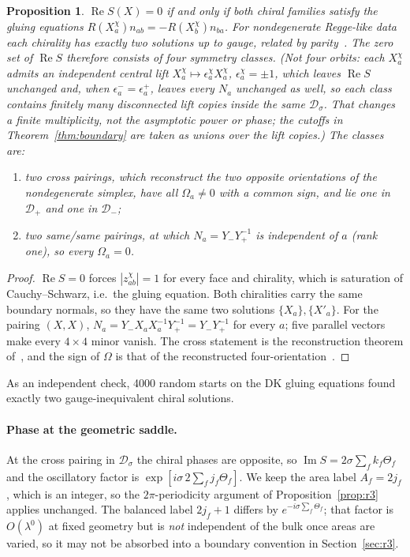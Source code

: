 \documentclass[11pt]{article}
\numberwithin{equation}{section}
\newtheorem{proposition}[theorem]{Proposition}
\theoremstyle{definition}
\theoremstyle{remark}
\newcommand{\Dom}{\mathcal D}
\renewcommand{\Re}{\operatorname{Re}}
\renewcommand{\Im}{\operatorname{Im}}
\begin{document}
\begin{proposition}\label{prop:crit}
$\Re S(X)=0$ if and only if both chiral families satisfy the gluing equations
$R(X_a^\chi)n_{ab}=-R(X_b^\chi)n_{ba}$. For nondegenerate Regge-like data each
chirality has exactly two solutions up to gauge, related by
parity~\cite{BarrettEtAl2009}. The zero set of $\Re S$ therefore consists of four symmetry classes. (Not four
orbits: each $X_a^\chi$ admits an independent central lift
$X_a^\chi\mapsto\epsilon_a^\chi X_a^\chi$, $\epsilon_a^\chi=\pm1$, which leaves
$\Re S$ unchanged and, when $\epsilon_a^-=\epsilon_a^+$, leaves every $N_a$
unchanged as well, so each class contains finitely many disconnected lift copies
inside the same $\Dom_\sigma$. That changes a finite multiplicity, not the
asymptotic power or phase; the cutoffs in Theorem~\ref{thm:boundary} are taken as
unions over the lift copies.) The classes are:
\begin{enumerate}
\item two \emph{cross} pairings, which reconstruct the two opposite orientations
of the nondegenerate simplex, have all $\Omega_a\neq0$ with a common sign, and lie
one in $\Dom_+$ and one in $\Dom_-$;
\item two \emph{same/same} pairings, at which $N_a=Y_-Y_+^{-1}$ is independent of
$a$ (rank one), so every $\Omega_a=0$.
\end{enumerate}
\end{proposition}

\begin{proof}
$\Re S=0$ forces $|z^\chi_{ab}|=1$ for every face and chirality, which is
saturation of Cauchy--Schwarz, i.e.\ the gluing equation. Both chiralities carry
the same boundary normals, so they have the same two solutions $\{X_a\},\{X'_a\}$.
For the pairing $(X,X)$, $N_a=Y_-X_aX_a^{-1}Y_+^{-1}=Y_-Y_+^{-1}$ for every $a$;
five parallel vectors make every $4\times4$ minor vanish. The cross statement is
the reconstruction theorem of~\cite{BarrettEtAl2009}, and the sign of $\Omega$ is
that of the reconstructed four-orientation~\cite{W2vertex}.
\end{proof}

As an independent check, 4000 random starts on the DK gluing equations found
exactly two gauge-inequivalent chiral solutions.

\paragraph{Phase at the geometric saddle.}
At the cross pairing in $\Dom_\sigma$ the chiral phases are opposite, so
$\Im S=2\sigma\sum_fk_f\Theta_f$ and the oscillatory factor is
$\exp[i\sigma\,2\sum_fj_f\Theta_f]$. We keep the area label $A_f=2j_f$, which is
an integer, so the $2\pi$-periodicity argument of Proposition~\ref{prop:r3}
applies unchanged. The balanced label $2j_f+1$ differs by
$e^{-i\sigma\sum_f\Theta_f}$; that factor is $O(\lambda^0)$ at fixed geometry but is
\emph{not} independent of the bulk once areas are varied, so it may not be
absorbed into a boundary convention in Section~\ref{sec:r3}.
\end{document}
